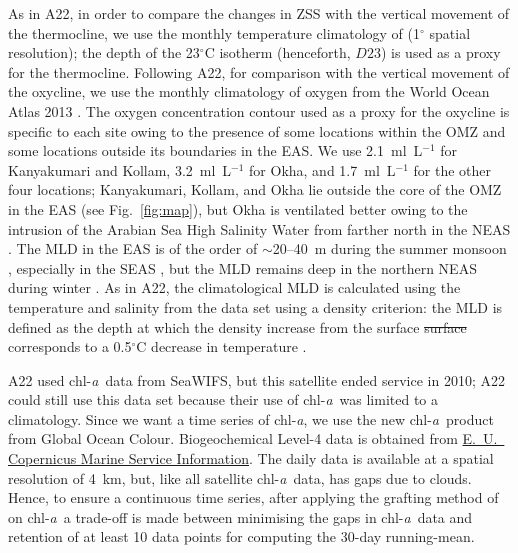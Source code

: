\documentclass[authoryear,review,11pt]{elsarticle}
\newcommand{\chla}{chl-{\emph{a}}}
\providecommand{\DIFdeltex}[1]{{\protect\color{red}\sout{#1}}}                      %
\providecommand{\DIFdelbegin}{} %
\providecommand{\DIFdelend}{} %
\providecommand{\DIFdel}[1]{\texorpdfstring{\DIFdeltex{#1}}{}} %
\begin{document}
As in A22, in order to compare the changes in ZSS with the vertical movement of the thermocline, we use the monthly temperature climatology of \citet{chatterjee2012new} (1$^{\circ}$ spatial resolution); the depth of the 23$^{\circ}$C isotherm (henceforth, $D23$) is used as a proxy for the thermocline. Following A22, for comparison with the vertical movement of the oxycline, we use the monthly climatology of oxygen from the World Ocean Atlas 2013 \citep{garcia2013oxygen}.  The oxygen concentration contour used as a proxy for the oxycline is specific to each site owing to the presence of some locations within the OMZ and some locations outside its boundaries in the EAS. We use 2.1~ml~L$^{-1}$ for Kanyakumari and Kollam, 3.2~ml~L$^{-1}$ for Okha, and 1.7~ml~L$^{-1}$ for the other four locations; Kanyakumari, Kollam, and Okha lie outside the core of the OMZ in the EAS (see Fig.~\ref{fig:map}), but Okha is ventilated better owing to the intrusion of the Arabian Sea High Salinity Water \citep[ASHSW;][]{rochford1964salinity, wyrtki1971oceanographic} from farther north in the NEAS \citep{banse2009wintertime, naqvi2006coastal, shankar2016inhibition}. The MLD in the EAS is of the order of $\sim$20--40~m during the summer monsoon \citep{shetye1990hydrography, shankar2002hydrography, sreenivas2008monthly}, especially in the SEAS \citep{shenoi2005hydrography}, but the MLD remains deep in the northern NEAS during winter \citep{shankar2016inhibition}. As in A22, the climatological MLD is calculated using the temperature and salinity from the \citet{chatterjee2012new} data set using a density criterion: the MLD is defined as the depth at which the density increase from the surface \DIFdelbegin \DIFdel{surface }\DIFdelend corresponds to a 0.5$^\circ$C decrease in temperature \citep{shenoi2004remote}. 

A22 used \chla\ data from SeaWIFS, but this satellite ended service in 2010; A22 could still use this data set because their use of \chla\ was limited to a climatology.  Since we want a time series of \chla, we use the new \chla\ product from Global Ocean Colour. Biogeochemical Level-4 data is obtained from \href{https://doi.org/10.48670/moi-00281}{E.~U.~ Copernicus Marine Service Information}. The daily data is available at a spatial resolution of 4~km, but, like all satellite \chla\ data, has gaps due to clouds. Hence, to ensure a continuous time series, after applying the grafting method of \citet{mukhopadhyay2017st} on \chla\, a trade-off is made between minimising the gaps in \chla\ data and retention of at least 10 data points for computing the 30-day running-mean.
\end{document}
